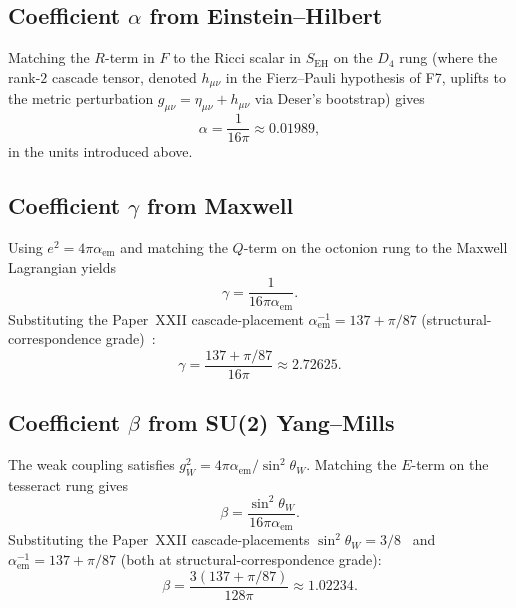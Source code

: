 \documentclass[12pt]{article}
\theoremstyle{definition}
\theoremstyle{remark}
\begin{document}
\subsection{Coefficient $\alpha$ from Einstein--Hilbert}

Matching the $R$-term in $F$ to the Ricci scalar in $S_{\mathrm{EH}}$ on the $D_4$ rung (where the rank-$2$ cascade tensor, denoted $h_{\mu\nu}$ in the Fierz--Pauli hypothesis of F7, uplifts to the metric perturbation $g_{\mu\nu} = \eta_{\mu\nu} + h_{\mu\nu}$ via Deser's bootstrap) gives
\begin{equation}\label{eq:alpha-match}
\alpha = \frac{1}{16\pi} \approx 0.01989,
\end{equation}
in the units introduced above.

\subsection{Coefficient $\gamma$ from Maxwell}

Using $e^2 = 4\pi \alpha_{\mathrm{em}}$ and matching the $Q$-term on the octonion rung to the Maxwell Lagrangian yields
\begin{equation}\label{eq:gamma-match}
\gamma = \frac{1}{16 \pi \alpha_{\mathrm{em}}}.
\end{equation}
Substituting the Paper~XXII cascade-placement $\alpha_{\mathrm{em}}^{-1} = 137 + \pi / 87$ (structural-correspondence grade)~\citep{SmartXXII}:
\begin{equation}
\gamma = \frac{137 + \pi / 87}{16 \pi} \approx 2.72625.
\end{equation}

\subsection{Coefficient $\beta$ from SU(2) Yang--Mills}

The weak coupling satisfies $g_W^2 = 4 \pi \alpha_{\mathrm{em}} / \sin^2 \theta_W$. Matching the $E$-term on the tesseract rung gives
\begin{equation}\label{eq:beta-match}
\beta = \frac{\sin^2 \theta_W}{16 \pi \alpha_{\mathrm{em}}}.
\end{equation}
Substituting the Paper~XXII cascade-placements $\sin^2 \theta_W = 3/8$~\citep{SmartXXII} and $\alpha_{\mathrm{em}}^{-1} = 137 + \pi / 87$ (both at structural-correspondence grade):
\begin{equation}
\beta = \frac{3(137 + \pi / 87)}{128 \pi} \approx 1.02234.
\end{equation}
\end{document}
